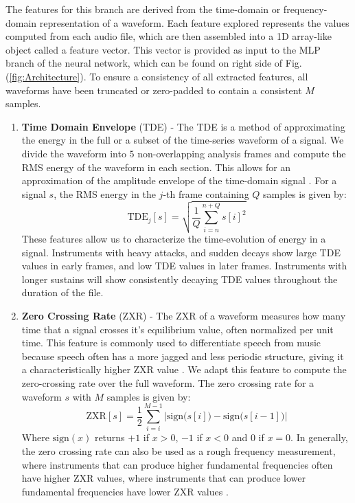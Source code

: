 \documentclass[conference,onecolumn,letterpaper]{IEEEtran}
\begin{document}
The features for this branch are derived from the time-domain or frequency-domain representation of a waveform. Each feature explored represents the values computed from each audio file, which are then assembled into a 1D array-like object called a feature vector. This vector is provided as input to the MLP branch of the neural network, which can be found on right side of Fig. (\ref{fig:Architecture}). To ensure a consistency of all extracted features, all waveforms have been truncated or zero-padded to contain a consistent $M$ samples.

\begin{enumerate}

\item\textbf{Time Domain Envelope} (TDE) - 
The TDE is a method of approximating the energy in the full or a subset of the time-series waveform of a signal. We divide the waveform into $5$ non-overlapping analysis frames and compute the RMS energy of the waveform in each section. This allows for an approximation of the amplitude envelope of the time-domain signal \cite{Virtanen}. For a signal $s$, the RMS energy in the $j$-th frame containing $Q$ samples is given by:
\begin{equation}
    \label{eqn:TDE}
    \text{TDE}_j[s] = \sqrt{\frac{1}{Q}\sum_{i=n}^{n+Q}s[i]^2}
\end{equation}
These features allow us to characterize the time-evolution of energy in a signal. Instruments with heavy attacks, and sudden decays show large TDE values in early frames, and low TDE values in later frames. Instruments with longer sustains will show consistently decaying TDE values throughout the duration of the file.

\item\textbf{Zero Crossing Rate} (ZXR) - 
The ZXR of a waveform measures how many time that a signal crosses it's equilibrium value, often normalized per unit time. This feature is commonly used to differentiate speech from music because speech often has a more jagged and less periodic structure, giving it a characteristically higher ZXR value \cite{Virtanen,Khan,Zhang}. We adapt this feature to compute the zero-crossing rate over the full waveform. The zero crossing rate for a waveform $s$ with $M$ samples is given by:
\begin{equation}
    \label{eqn:ZXR}
    \text{ZXR}[s] = \frac{1}{2}\sum_{i=i}^{M-1}\Big| \text{sign}\big(s[i]\big) - \text{sign}\big(s[i-1]\big) \Big|
\end{equation}
Where $\text{sign}(x)$  returns $+1$ if $x > 0$, $-1$ if $x < 0$ and $0$ if $x = 0$. In generally, the zero crossing rate can also be used as a rough frequency measurement, where instruments that can produce higher fundamental frequencies often have higher ZXR values, where instruments that can produce lower fundamental frequencies have lower ZXR values \cite{Zhang}.


\end{enumerate}
\end{document}
